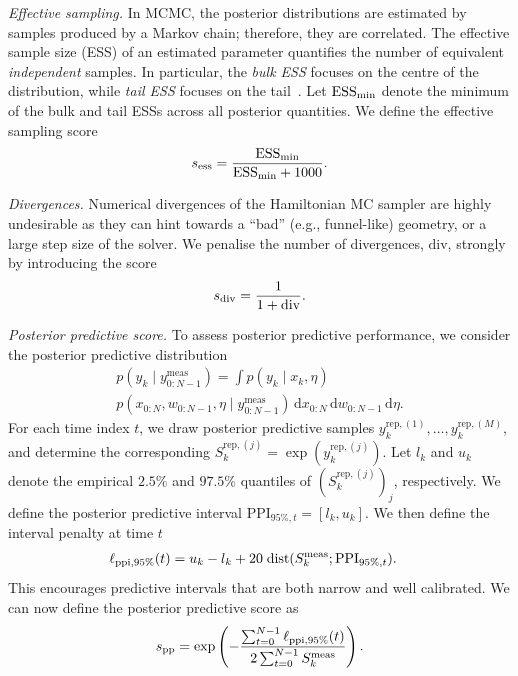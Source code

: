 \documentclass[11pt]{report}
\begin{document}
\textit{Effective sampling.}
In MCMC, the posterior distributions are estimated by samples
produced by a Markov chain; therefore, they are correlated.
The effective sample size (ESS) of an estimated parameter 
quantifies the number of equivalent \textit{independent} samples.
In particular, the \textit{bulk ESS} focuses on the 
centre of the distribution, while \textit{tail ESS} focuses on 
the tail~\cite{Vehtari2021}. 
Let $\mathrm{ESS}_{\rm min}$ denote the minimum of the bulk and 
tail ESSs across all posterior quantities.
We define the effective sampling score 
\begin{equation}
    s_{\rm ess} = \frac{\mathrm{ESS}_{\rm min}}{\mathrm{ESS}_{\rm min} + 1000}.
\end{equation} 



\textit{Divergences.} Numerical divergences of the Hamiltonian 
MC sampler are highly undesirable as they can hint towards a ``bad''
(e.g., funnel-like) geometry, or a large step size of the solver.
We penalise the number of divergences, $\mathrm{div}$, strongly
by introducing the score 
\begin{equation}
    s_{\rm div} = \frac{1}{1+\mathrm{div}}.
\end{equation}

\textit{Posterior predictive score.}
To assess posterior predictive performance, we consider the posterior predictive
distribution
\begin{multline}
p(y_k \mid y_{0:N-1}^{\mathrm{meas}})
=
\int
p(y_k \mid x_k,\eta)\\
p(x_{0:N},w_{0:N-1},\eta \mid y_{0:N-1}^{\mathrm{meas}})
\,\mathrm d x_{0:N}\,\mathrm d w_{0:N-1}\,\mathrm d\eta.
\end{multline}
For each time index $t$, we draw posterior predictive samples
$y_k^{\mathrm{rep},(1)},\dots,y_k^{\mathrm{rep},(M)}$, 
and determine the corresponding 
$S_k^{\mathrm{rep},(j)} = \exp(y_k^{\mathrm{rep},(j)})$.
Let $l_k$ and $u_k$ denote the empirical $2.5\%$ and 
$97.5\%$ quantiles of $(S_k^{\mathrm{rep},(j)})_j$, respectively. 
We define the posterior predictive interval PPI$_{95\%, t} = [l_k, u_k]$.
We then define the interval penalty at time $t$
\begin{align}
\ell_{\rm ppi, 95\%}(t)
&{}={}
u_k - l_k
+20\;\mathrm{dist}(S_k^{\mathrm{meas}}; \mathrm{PPI}_{95\%, t}).
\end{align}
This encourages predictive intervals that are both narrow 
and well calibrated. 
We can now define the posterior predictive score as
\begin{equation}
s_{\mathrm{pp}}
=
\exp\left(
-
\frac{
\sum_{t=0}^{N-1}\ell_{\rm ppi, 95\%}(t)
}{
2\sum_{t=0}^{N-1}S_k^{\rm meas}
}
\right).
\end{equation}
\end{document}
